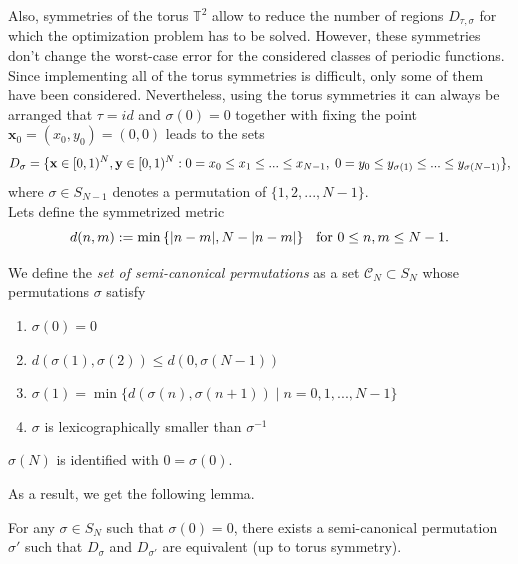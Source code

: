 Also, symmetries of the torus $\mathbb{T}^2$ allow to reduce the number of regions $D_{\tau,\sigma}$ for which the optimization problem has to be solved. However, these symmetries don't change the worst-case error for the considered classes of periodic functions. Since implementing all of the torus symmetries is difficult, only some of them have been considered. Nevertheless, using the torus symmetries it can always be arranged that $\tau = id$ and $\sigma(0) = 0$ together with fixing the point $\textbf{x}_0 = (x_0,y_0) = (0,0)$ leads to the sets
\begin{equation*}
    D_{\sigma} = \{ \textbf{x}\in [0,1)^N, \textbf{y}\in [0,1)^N : 0 = x_0 \leq x_1 \leq ... \leq x_{N-1}, \hspace{1mm} 0 = y_0 \leq y_{\sigma (1)} \leq ... \leq y_{\sigma (N-1)} \},
\end{equation*}
where $\sigma \in S_{N-1}$ denotes a permutation of $\{1,2,...,N-1\}$.\\

Lets define the symmetrized metric 
\begin{equation*}
    d(n,m) := \min{ \{\lvert n-m\rvert, N-\lvert n-m\rvert \}} \hspace{2mm} \text{ for } 0\leq n,m \leq N-1.
\end{equation*}

\vspace{2mm}
\begin{Def}
    We define the \textit{set of semi-canonical permutations} as a set $\mathcal{C}_N \subset S_N$ whose permutations $\sigma$ satisfy
    \begin{enumerate}
        \item $\sigma(0) = 0$
        \item $d(\sigma(1),\sigma(2)) \leq d(0,\sigma(N-1))$
        \item $\sigma(1) = \min{ \{ d(\sigma(n),\sigma(n+1)) \mid n=0,1,...,N-1 \} }$
        \item $\sigma$ is lexicographically smaller than $\sigma^{-1}$
    \end{enumerate}
    $\sigma(N)$ is identified with $0=\sigma(0)$.
\end{Def}

\vspace{2mm}
As a result, we get the following lemma.\\

\begin{Lemma}
    For any $\sigma \in S_N$ such that $\sigma(0)=0$, there exists a semi-canonical permutation $\sigma'$ such that $D_{\sigma}$ and $D_{\sigma'}$ are equivalent (up to torus symmetry).
\end{Lemma}
\vspace{2mm}

